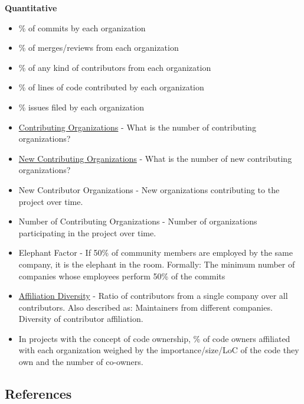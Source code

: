 \textbf{Quantitative}

\begin{itemize}
\tightlist
\item
  \% of commits by each organization
\item
  \% of merges/reviews from each organization
\item
  \% of any kind of contributors from each organization
\item
  \% of lines of code contributed by each organization
\item
  \% issues filed by each organization
\item
  \href{https://github.com/chaoss/metrics/blob/master/activity-metrics/contributing-organizations.md}{Contributing
  Organizations} - What is the number of contributing organizations?
\item
  \href{https://github.com/chaoss/metrics/blob/master/activity-metrics/new-contributing-organizations.md}{New
  Contributing Organizations} - What is the number of new contributing
  organizations?
\item
  New Contributor Organizations - New organizations contributing to the
  project over time.
\item
  Number of Contributing Organizations - Number of organizations
  participating in the project over time.
\item
  Elephant Factor - If 50\% of community members are employed by the
  same company, it is the elephant in the room. Formally: The minimum
  number of companies whose employees perform 50\% of the commits
\item
  \href{https://github.com/chaoss/metrics/blob/master/activity-metrics/contributor-diversity.md}{Affiliation
  Diversity} - Ratio of contributors from a single company over all
  contributors. Also described as: Maintainers from different companies.
  Diversity of contributor affiliation.
\item
  In projects with the concept of code ownership, \% of code owners
  affiliated with each organization weighed by the importance/size/LoC
  of the code they own and the number of co-owners.
\end{itemize}

\hypertarget{references}{%
\subsection{References}\label{references}}

